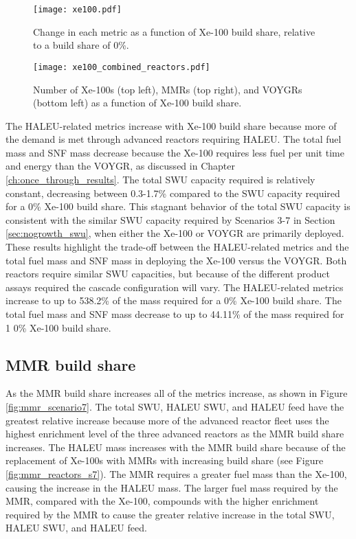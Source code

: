 \begin{figure}
    \centering
    \texttt{[image: xe100.pdf]}
    \caption{Change in each metric as a function of Xe-100 build share, 
    relative to a build share of 0\%.}
    \label{fig:xe100_scenario7}
\end{figure}

\begin{figure}
    \centering
    \texttt{[image: xe100\_combined\_reactors.pdf]}
    \caption{Number of Xe-100s (top left), MMRs (top right), and VOYGRs
    (bottom left) as a function of Xe-100 build share.}
    \label{fig:xe100_s7_combined_reactors}
\end{figure}

The \gls{HALEU}-related metrics increase with Xe-100 build share because more of 
the demand is met through advanced reactors requiring \gls{HALEU}. The total 
fuel mass and \gls{SNF} mass decrease because the 
Xe-100 requires less fuel per unit time and energy than the VOYGR, as discussed 
in Chapter \ref{ch:once_through_results}. The total \gls{SWU} capacity required 
is relatively constant, decreasing between 0.3-1.7\% compared to the \gls{SWU} capacity 
required for a 0\% Xe-100 build share. This stagnant behavior of the total 
\gls{SWU} capacity is consistent with the similar \gls{SWU} capacity required 
by Scenarios 3-7 in Section \ref{sec:nogrowth_swu}, when either the Xe-100 or 
VOYGR are primarily deployed. These results highlight the trade-off between the
\gls{HALEU}-related metrics and the total fuel mass and \gls{SNF} mass in deploying 
the Xe-100 versus the VOYGR. Both reactors require similar \gls{SWU} capacities, 
but because of the different product assays required the cascade configuration 
will vary. The \gls{HALEU}-related metrics increase to up to 538.2\% of the 
mass required 
for a 0\% Xe-100 build share. The total fuel mass and \gls{SNF} mass decrease 
to up to 44.11\% of the mass required for 1 0\% Xe-100 build share. 

\subsection{MMR build share}
As the \gls{MMR} build share increases all of the metrics increase, as shown 
in Figure \ref{fig:mmr_scenario7}. The total \gls{SWU}, \gls{HALEU} \gls{SWU}, 
and \gls{HALEU} feed have the greatest relative increase because more of the 
advanced reactor fleet uses the highest enrichment level of the three 
advanced reactors as the \gls{MMR} build share increases. The \gls{HALEU} mass 
increases with the \gls{MMR} build share because of the replacement of Xe-100s 
with \glspl{MMR} with increasing build share (see Figure \ref{fig:mmr_reactors_s7}).
The \gls{MMR} requires a greater fuel mass than the Xe-100, causing the increase 
in the \gls{HALEU} mass. The larger fuel mass required by the \gls{MMR}, compared 
with the Xe-100, compounds with the higher enrichment required by the \gls{MMR} 
to cause the greater relative increase in the total \gls{SWU}, \gls{HALEU} \gls{SWU}, 
and \gls{HALEU} feed. 

